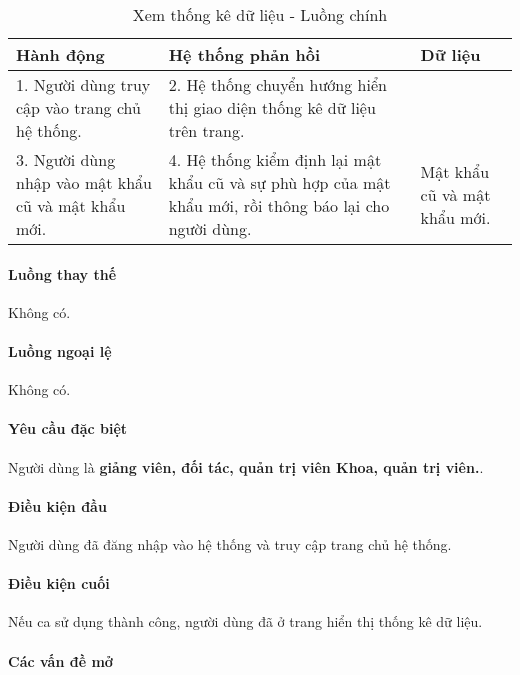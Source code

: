 \documentclass[./../main.tex]{subfiles}
\begin{document}
\begin{table}[H]
  \caption{Xem thống kê dữ liệu - Luồng chính}
  \label{tab:view_dashboard}
  \begin{tabularx}{\textwidth}{|X|X|X|}
    \hline
\textbf{Hành động} & \textbf{Hệ thống phản hồi} & \textbf{Dữ liệu} \\ \hline
1. Người dùng truy cập vào trang chủ hệ thống. & 2. Hệ thống chuyển hướng hiển thị giao diện thống kê dữ liệu trên trang. &  \\ \hline
3. Người dùng nhập vào mật khẩu cũ và mật khẩu mới. & 4. Hệ thống kiểm định lại mật khẩu cũ và sự phù hợp của mật khẩu mới, rồi thông báo lại cho người dùng. & Mật khẩu cũ và mật khẩu mới. \\ \hline
  \end{tabularx}
\end{table}

\paragraph*{Luồng thay thế} Không có.

\paragraph*{Luồng ngoại lệ} Không có.

\paragraph*{Yêu cầu đặc biệt}

Người dùng là \textbf{giảng viên, đối tác, quản trị viên Khoa, quản trị viên.}.

\paragraph*{Điều kiện đầu}

Người dùng đã đăng nhập vào hệ thống và truy cập trang chủ hệ thống.

\paragraph*{Điều kiện cuối}

Nếu ca sử dụng thành công, người dùng đã ở trang hiển thị thống kê dữ liệu.

\paragraph*{Các vấn đề mở}
\end{document}
